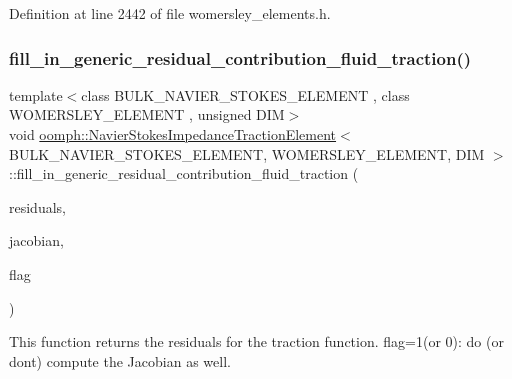 Definition at line 2442 of file womersley\+\_\+elements.\+h.

\mbox{\label{classoomph_1_1NavierStokesImpedanceTractionElement_a0ebea8eb00325fda0ff0b4ad38b78dc0}} 
\subsubsection{\texorpdfstring{fill\+\_\+in\+\_\+generic\+\_\+residual\+\_\+contribution\+\_\+fluid\+\_\+traction()}{fill\_in\_generic\_residual\_contribution\_fluid\_traction()}}
{\footnotesize\ttfamily template$<$class B\+U\+L\+K\+\_\+\+N\+A\+V\+I\+E\+R\+\_\+\+S\+T\+O\+K\+E\+S\+\_\+\+E\+L\+E\+M\+E\+NT , class W\+O\+M\+E\+R\+S\+L\+E\+Y\+\_\+\+E\+L\+E\+M\+E\+NT , unsigned D\+IM$>$ \\
void \hyperlink{classoomph_1_1NavierStokesImpedanceTractionElement}{oomph\+::\+Navier\+Stokes\+Impedance\+Traction\+Element}$<$ B\+U\+L\+K\+\_\+\+N\+A\+V\+I\+E\+R\+\_\+\+S\+T\+O\+K\+E\+S\+\_\+\+E\+L\+E\+M\+E\+NT, W\+O\+M\+E\+R\+S\+L\+E\+Y\+\_\+\+E\+L\+E\+M\+E\+NT, D\+IM $>$\+::fill\+\_\+in\+\_\+generic\+\_\+residual\+\_\+contribution\+\_\+fluid\+\_\+traction (\begin{DoxyParamCaption}\item[{\hyperlink{classoomph_1_1Vector}{Vector}$<$ double $>$ \&}]{residuals,  }\item[{\hyperlink{classoomph_1_1DenseMatrix}{Dense\+Matrix}$<$ double $>$ \&}]{jacobian,  }\item[{unsigned}]{flag }\end{DoxyParamCaption})\hspace{0.3cm}{\ttfamily [protected]}}



This function returns the residuals for the traction function. flag=1(or 0)\+: do (or don\textquotesingle{}t) compute the Jacobian as well. 

